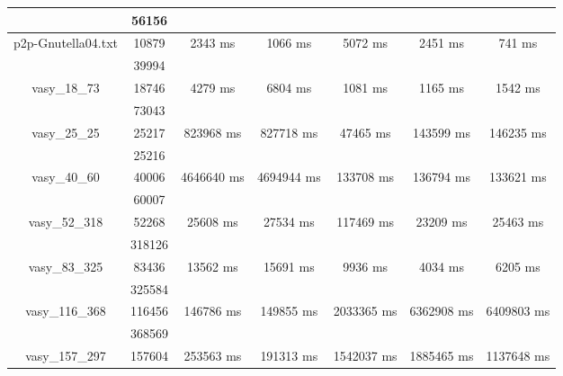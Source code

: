 \documentclass[../master/master.tex]{subfiles}
\begin{document}
\begin{center}
\begin{tabular}{ |c|c||c||c||c||c||c|| }
\cline{2-2}
 & 56156  & & & & & \\
\hline
\multirow{2}{3.8em}{p2p-Gnutella04.txt} & 10879 & \multirow{2}{3.8em}{2343 ms} & \multirow{2}{3.8em}{1066 ms} & \multirow{2}{3.8em}{5072 ms} & \multirow{2}{3.8em}{2451 ms} & \multirow{2}{3.8em}{741 ms} \\
\cline{2-2}
 & 39994  & & & & & \\
\hline
\multirow{2}{3.8em}{vasy\_18\_73} & 18746 & \multirow{2}{3.8em}{4279 ms} & \multirow{2}{3.8em}{6804 ms} & \multirow{2}{3.8em}{1081 ms} & \multirow{2}{3.8em}{1165 ms} & \multirow{2}{3.8em}{1542 ms} \\
\cline{2-2}
 & 73043  & & & & & \\
\hline
\multirow{2}{3.8em}{vasy\_25\_25} & 25217 & \multirow{2}{3.8em}{823968 ms} & \multirow{2}{3.8em}{827718 ms} & \multirow{2}{3.8em}{47465 ms} & \multirow{2}{3.8em}{143599 ms} & \multirow{2}{3.8em}{146235 ms} \\
\cline{2-2}
 & 25216  & & & & & \\
\hline
\multirow{2}{3.8em}{vasy\_40\_60} & 40006 & \multirow{2}{3.8em}{4646640 ms} & \multirow{2}{3.8em}{4694944 ms} & \multirow{2}{3.8em}{133708 ms} & \multirow{2}{3.8em}{136794 ms} & \multirow{2}{3.8em}{133621 ms} \\
\cline{2-2}
 & 60007  & & & & & \\
\hline
\multirow{2}{3.8em}{vasy\_52\_318} & 52268 & \multirow{2}{3.8em}{25608 ms} & \multirow{2}{3.8em}{27534 ms} & \multirow{2}{3.8em}{117469 ms} & \multirow{2}{3.8em}{23209 ms} & \multirow{2}{3.8em}{25463 ms} \\
\cline{2-2}
 & 318126  & & & & & \\
\hline
\multirow{2}{3.8em}{vasy\_83\_325} & 83436 & \multirow{2}{3.8em}{13562 ms} & \multirow{2}{3.8em}{15691 ms} & \multirow{2}{3.8em}{9936 ms} & \multirow{2}{3.8em}{4034 ms} & \multirow{2}{3.8em}{6205 ms} \\
\cline{2-2}
 & 325584  & & & & & \\
\hline
\multirow{2}{3.8em}{vasy\_116\_368} & 116456 & \multirow{2}{3.8em}{146786 ms} & \multirow{2}{3.8em}{149855 ms} & \multirow{2}{3.8em}{2033365 ms} & \multirow{2}{3.8em}{6362908 ms} & \multirow{2}{3.8em}{6409803 ms} \\
\cline{2-2}
 & 368569  & & & & & \\
\hline
\multirow{2}{3.8em}{vasy\_157\_297} & 157604 & \multirow{2}{3.8em}{253563 ms} & \multirow{2}{3.8em}{191313 ms} & \multirow{2}{3.8em}{1542037 ms} & \multirow{2}{3.8em}{1885465 ms} & \multirow{2}{3.8em}{1137648 ms} \\

\end{tabular}
\end{center}
\end{document}
